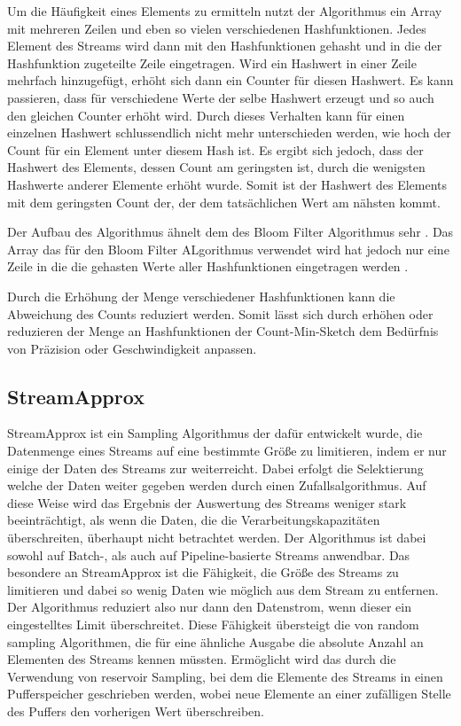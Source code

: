 Um die Häufigkeit eines Elements zu ermitteln 
nutzt der Algorithmus ein Array mit mehreren Zeilen 
und eben so vielen verschiedenen Hashfunktionen. 
Jedes Element des Streams wird dann mit den Hashfunktionen gehasht 
und in die der Hashfunktion zugeteilte Zeile eingetragen. 
Wird ein Hashwert in einer Zeile mehrfach hinzugefügt, 
erhöht sich dann ein Counter für diesen Hashwert. 
Es kann passieren, dass für verschiedene Werte der selbe Hashwert erzeugt 
und so auch den gleichen Counter erhöht wird. 
Durch dieses Verhalten kann für einen einzelnen Hashwert 
schlussendlich nicht mehr unterschieden werden, 
wie hoch der Count für ein Element unter diesem Hash ist. 
Es ergibt sich jedoch, dass der Hashwert des Elements, dessen Count am geringsten ist, 
durch die wenigsten Hashwerte anderer Elemente erhöht wurde. 
Somit ist der Hashwert des Elements mit dem geringsten Count der, 
der dem tatsächlichen Wert am nähsten kommt. \cite{cormode2017}

Der Aufbau des Algorithmus ähnelt dem des Bloom Filter Algorithmus sehr \cite{cormode2017}. 
Das Array das für den Bloom Filter ALgorithmus verwendet wird 
hat jedoch nur eine Zeile in die die gehasten Werte aller Hashfunktionen eingetragen werden \cite{cormode2017}.

Durch die Erhöhung der Menge verschiedener Hashfunktionen kann die Abweichung des Counts reduziert werden. 
Somit lässt sich durch erhöhen oder reduzieren der Menge an Hashfunktionen 
der Count-Min-Sketch dem Bedürfnis von Präzision oder Geschwindigkeit anpassen.

\subsection{StreamApprox}

StreamApprox ist ein Sampling Algorithmus der dafür entwickelt wurde, 
die Datenmenge eines Streams auf eine bestimmte Größe zu limitieren, 
indem er nur einige der Daten des Streams zur weiterreicht. 
Dabei erfolgt die Selektierung welche der Daten weiter gegeben werden durch einen Zufallsalgorithmus. 
Auf diese Weise wird das Ergebnis der Auswertung des Streams weniger stark beeinträchtigt, 
als wenn die Daten, die die Verarbeitungskapazitäten überschreiten, 
überhaupt nicht betrachtet werden. 
Der Algorithmus ist dabei sowohl auf Batch-, als auch auf Pipeline-basierte Streams anwendbar.
Das besondere an StreamApprox ist die Fähigkeit, 
die Größe des Streams zu limitieren und dabei so wenig Daten wie möglich aus dem Stream zu entfernen. 
Der Algorithmus reduziert also nur dann den Datenstrom, wenn dieser ein eingestelltes Limit überschreitet. 
Diese Fähigkeit übersteigt die von random sampling Algorithmen, 
die für eine ähnliche Ausgabe die absolute Anzahl an Elementen des Streams kennen müssten. 
Ermöglicht wird das durch die Verwendung von reservoir Sampling, 
bei dem die Elemente des Streams in einen Pufferspeicher geschrieben werden, 
wobei neue Elemente an einer zufälligen Stelle des Puffers den vorherigen Wert überschreiben. \cite{quoc2017} 

